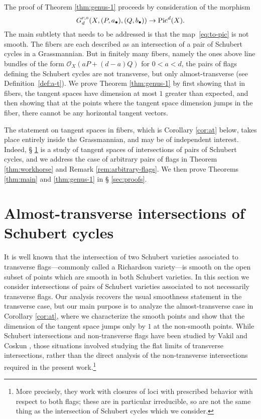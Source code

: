 \documentclass{amsart}
\begin{document}
The proof of Theorem \ref{thm:genus-1} proceeds by consideration of
the morphism
\begin{equation}\label{eq:to-pic}
G^{r,\circ}_d(X,(P,a_{\bullet}),(Q,b_{\bullet})) \to \operatorname{Pic}^d(X).
\end{equation}
The main subtlety that needs to be addressed is that the map~\eqref{eq:to-pic} 
is not smooth. The fibers are each described as an intersection of a pair
of Schubert cycles in a Grassmannian.  But in finitely many fibers, namely the ones above line bundles of the form $\mathcal{O}_X(aP+(d\!-\!a)Q)$ for $0<a<d$, the
pairs of flags defining the Schubert cycles are not transverse, but only almost-transverse (see 
Definition~\ref{def:a-t}). We prove Theorem
\ref{thm:genus-1} by first showing that in fibers, the tangent spaces
have dimension at most $1$ greater than expected, and then showing
that at the points where the tangent space dimension jumps in the fiber,
there cannot be any horizontal tangent vectors. 

The statement on tangent spaces in fibers,
which is Corollary \ref{cor:at} below, takes place entirely inside the 
Grassmannian, and may be of independent interest. Indeed, \S 
\ref{sec:a-t} is a study of tangent spaces of intersections of
pairs of Schubert cycles, and we address the case of arbitrary pairs of
flags in Theorem \ref{thm:workhorse} and Remark \ref{rem:arbitrary-flags}.
We then prove Theorems \ref{thm:main} and \ref{thm:genus-1} in \S
\ref{sec:proofs}.





\section{Almost-transverse intersections of Schubert cycles}\label{sec:a-t}

It is well known that the intersection of two Schubert varieties associated
to transverse flags---commonly called a Richardson variety---is 
smooth on the open subset of points which are smooth in both Schubert 
varieties.  In this section we consider intersections of pairs of Schubert 
varieties associated to not necessarily transverse flags. Our analysis 
recovers the usual smoothness statement in the transverse case, but our main 
purpose is to analyze the almost-transverse case in Corollary \ref{cor:at}, 
where we characterize the smooth
points and show that the dimension of the tangent space jumps only by $1$ 
at the non-smooth points. While Schubert intersections and non-transverse 
flags have been studied by Vakil \cite{va7} and Coskun 
\cite{co3}, those situations involved studying the flat limits of transverse
intersections, rather than the direct analysis of the non-transverse
intersections required in the present work.\footnote{More precisely, they
work with closures of loci with prescribed behavior with respect to both
flags; these are in particular irreducible, so are not the same thing as
the intersection of Schubert cycles which we consider.}
\end{document}
